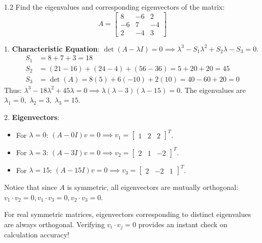 \begin{subjectiveq}{1.2}
Find the eigenvalues and corresponding eigenvectors of the matrix:
\begin{equation}
A = \begin{bmatrix}
8 & -6 & 2 \\
-6 & 7 & -4 \\
2 & -4 & 3
\end{bmatrix}
\end{equation}
\end{subjectiveq}

\begin{solbox}
1. \textbf{Characteristic Equation}: $\det(A - \lambda I) = 0 \implies \lambda^3 - S_1 \lambda^2 + S_2 \lambda - S_3 = 0$.
\begin{align}
S_1 &= 8 + 7 + 3 = 18 \\
S_2 &= (21 - 16) + (24 - 4) + (56 - 36) = 5 + 20 + 20 = 45 \\
S_3 &= \det(A) = 8(5) + 6(-10) + 2(10) = 40 - 60 + 20 = 0
\end{align}
Thus: $\lambda^3 - 18\lambda^2 + 45\lambda = 0 \implies \lambda(\lambda - 3)(\lambda - 15) = 0$.
The eigenvalues are $\lambda_1 = 0, \; \lambda_2 = 3, \; \lambda_3 = 15$.

2. \textbf{Eigenvectors}:
\begin{itemize}
    \item For $\lambda = 0$: $(A - 0I)v = 0 \implies v_1 = \begin{bmatrix} 1 & 2 & 2 \end{bmatrix}^T$.
    \item For $\lambda = 3$: $(A - 3I)v = 0 \implies v_2 = \begin{bmatrix} 2 & 1 & -2 \end{bmatrix}^T$.
    \item For $\lambda = 15$: $(A - 15I)v = 0 \implies v_3 = \begin{bmatrix} 2 & -2 & 1 \end{bmatrix}^T$.
\end{itemize}
Notice that since $A$ is symmetric, all eigenvectors are mutually orthogonal: $v_1 \cdot v_2 = 0, v_1 \cdot v_3 = 0, v_2 \cdot v_3 = 0$.
\end{solbox}

\begin{examinertip}
For real symmetric matrices, eigenvectors corresponding to distinct eigenvalues are always orthogonal. Verifying $v_i \cdot v_j = 0$ provides an instant check on calculation accuracy!
\end{examinertip}

